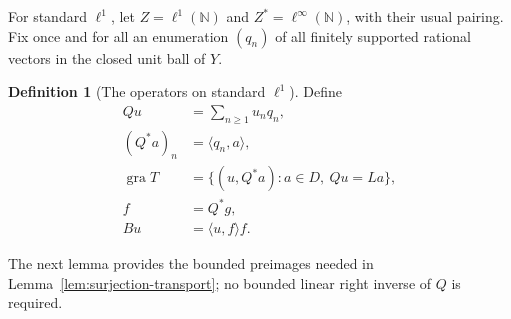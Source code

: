 \documentclass[11pt]{article}
\newcommand{\N}{\mathbb N}
\newcommand{\gra}{\operatorname{gra}}
\newcommand{\pair}[2]{\langle #1,#2\rangle}
\theoremstyle{definition}
\newtheorem{definition}{Definition}
\theoremstyle{remark}
\begin{document}
For standard $\ell^1$, let $Z=\ell^1(\N)$ and $Z^*=\ell^\infty(\N)$, with their usual pairing. Fix once and for all an enumeration $(q_n)$ of all finitely supported rational vectors in the closed unit ball of $Y$.
\begin{definition}[The operators on standard $\ell^1$]
Define
\begin{equation}
\begin{aligned}
Qu&=\sum_{n\ge1}u_nq_n,\\
(Q^*a)_n&=\pair{q_n}{a},\\
\gra T&=\{(u,Q^*a):a\in D,\ Qu=La\},\\
f&=Q^*g,\\
Bu&=\pair{u}{f}f.
\end{aligned}
\label{eq:D10}
\end{equation}
\end{definition}
The next lemma provides the bounded preimages needed in Lemma~\ref{lem:surjection-transport}; no bounded linear right inverse of $Q$ is required.
\end{document}
